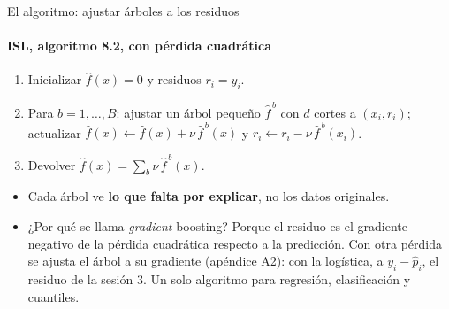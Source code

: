 \documentclass{beamer}
\newcommand{\1}{\mathbb{I}}
\begin{document}
\begin{frame}{El algoritmo: ajustar árboles a los residuos}
\framesubtitle{ISL, algoritmo 8.2, con pérdida cuadrática}
\small
\begin{enumerate}\itemsep2pt
  \item Inicializar $\hat{f}(x) = 0$ y residuos $r_i = y_i$.
  \item Para $b = 1, \ldots, B$: ajustar un árbol pequeño $\hat{f}^{\,b}$ con $d$ cortes a $(x_i, r_i)$; actualizar $\hat{f}(x) \leftarrow \hat{f}(x) + \nu\, \hat{f}^{\,b}(x)$ y $r_i \leftarrow r_i - \nu\, \hat{f}^{\,b}(x_i)$.
  \item Devolver $\hat{f}(x) = \sum_b \nu\, \hat{f}^{\,b}(x)$.
\end{enumerate}
\begin{center}
\end{center}
\pause
\begin{itemize}\itemsep3pt
  \item Cada árbol ve \textbf{lo que falta por explicar}, no los datos originales.
  \item ¿Por qué se llama \emph{gradient} boosting? Porque el residuo es el gradiente negativo de la pérdida cuadrática respecto a la predicción. Con otra pérdida se ajusta el árbol a su gradiente (apéndice A2): con la logística, a $y_i - \hat{p}_i$, el residuo de la sesión 3. Un solo algoritmo para regresión, clasificación y cuantiles.
\end{itemize}
\end{frame}
\end{document}

